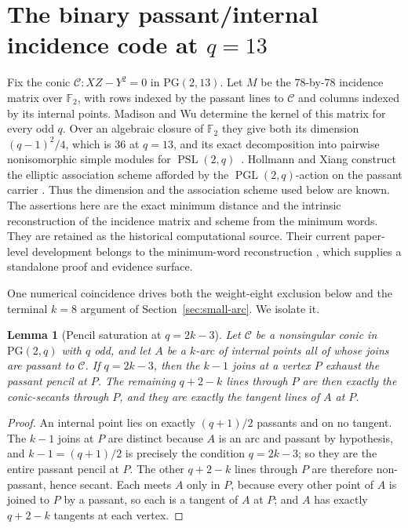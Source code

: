 \documentclass[11pt]{article}
\newtheorem{lemma}[theorem]{Lemma}
\theoremstyle{remark}
\newcommand{\PG}{\mathrm{PG}}
\newcommand{\F}{\mathbb{F}}
\newcommand{\cC}{\mathcal{C}}
\begin{document}
\section{The binary passant/internal incidence code at
\texorpdfstring{$q=13$}{q=13}}
\label{sec:q13-tangent-code}

Fix the conic $\cC:XZ-Y^2=0$ in $\PG(2,13)$.  Let $M$ be the
$78$-by-$78$ incidence matrix over $\F_2$, with rows indexed by the
passant lines to $\cC$ and columns indexed by its internal points.
Madison and Wu determine the kernel of this matrix for every odd $q$.  Over
an algebraic closure of $\F_2$ they give both its dimension $(q-1)^2/4$,
which is $36$ at $q=13$, and its exact decomposition into pairwise
nonisomorphic simple modules for
$\operatorname{PSL}(2,q)$~\cite[Theorem~6.1, Corollary~6.3]{MadisonWu2012}.
Hollmann and Xiang construct the
elliptic association scheme afforded by the
$\operatorname{PGL}(2,q)$-action on the passant carrier
\cite[\S3]{HollmannXiang2006}.  Thus the dimension and the association
scheme used below are known.  The assertions here are the exact minimum
distance and the intrinsic reconstruction of the incidence matrix and
scheme from the minimum words.  They are retained as the historical
computational source.  Their current paper-level development belongs to the
minimum-word reconstruction \cite{RuddPassant2026}, which supplies a
standalone proof and evidence surface.

One numerical coincidence drives both the weight-eight exclusion below and
the terminal $k=8$ argument of Section~\ref{sec:small-arc}.  We isolate it.

\begin{lemma}[Pencil saturation at $q=2k-3$]
\label{lem:pencil-saturation}
Let $\cC$ be a nonsingular conic in $\PG(2,q)$ with $q$ odd, and let $A$ be
a $k$-arc of internal points all of whose joins are passant to $\cC$.  If
$q=2k-3$, then the $k-1$ joins at a vertex $P$ exhaust the passant pencil
at $P$.  The remaining $q+2-k$ lines through $P$ are then exactly the
conic-secants through $P$, and they are exactly the tangent lines of $A$ at
$P$.
\end{lemma}

\begin{proof}
An internal point lies on exactly $(q+1)/2$ passants and on no tangent.
The $k-1$ joins at $P$ are distinct because $A$ is an arc and passant by
hypothesis, and $k-1=(q+1)/2$ is precisely the condition $q=2k-3$; so they
are the entire passant pencil at $P$.  The other $q+2-k$ lines through $P$
are therefore non-passant, hence secant.  Each meets $A$ only in $P$,
because every other point of $A$ is joined to $P$ by a passant, so each is
a tangent of $A$ at $P$; and $A$ has exactly $q+2-k$ tangents at each
vertex.
\end{proof}
\end{document}
